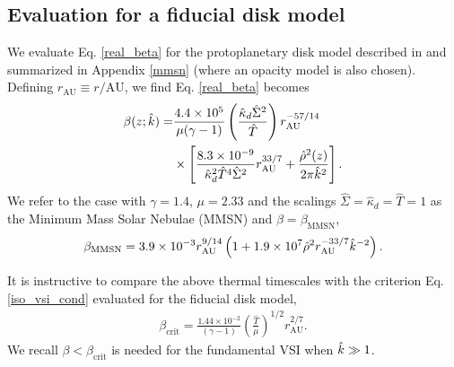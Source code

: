 \subsection{Evaluation for a fiducial disk model}
We evaluate Eq. \ref{real_beta} for the protoplanetary disk model
described in \cite{chiang10} and summarized in Appendix \ref{mmsn}
(where an opacity model is also chosen). Defining $r_\mathrm{AU}\equiv
r/\mathrm{AU}$, we find Eq. \ref{real_beta} becomes
\begin{align}\label{beta_mmsn}
  \beta(z; \hat{k}) =
  &\frac{4.4\times10^5}{\mu(\gamma-1)}\left(\frac{\hat{\kappa}_d\hat{\Sigma}^2}{\hat{T}}\right)r_\mathrm{AU}^{-57/14}\notag\\
&\times\left[\frac{8.3\times10^{-9}}{\hat{\kappa}_d^2\hat{T}^4\hat{\Sigma}^2}r_\mathrm{AU}^{33/7}+\frac{\hat{\rho}^2(z)}{2\pi\hat{k}^2}\right].        
\end{align} 
We refer to the case with $\gamma=1.4$, $\mu=2.33$ and the scalings
$\hat{\Sigma}=\hat{\kappa}_d=\hat{T}=1$ as the Minimum Mass Solar
Nebulae (MMSN) and $\beta=\beta_\mathrm{MMSN}$, 
\begin{align}\label{beta_mmsn_simp}
  \beta_\mathrm{MMSN} = 3.9\times10^{-3} r_\mathrm{AU}^{9/14}\left( 1 +
    1.9\times10^7\hat{\rho}^2r_\mathrm{AU}^{-33/7}\hat{k}^{-2}\right). 
\end{align}

It is instructive to compare the above thermal timescales
with the criterion Eq. \ref{iso_vsi_cond} evaluated for the fiducial disk model,    
\begin{align}\label{bcrit_mmsn}
  \beta_\mathrm{crit} = \frac{1.44\times10^{-2}}{(\gamma
    -1)}\left(\frac{\hat{T}}{\mu}\right)^{1/2}r_\mathrm{AU}^{2/7}. 
\end{align}
We recall $\beta < \beta_\mathrm{crit}$ is needed for the
fundamental VSI when $\hat{k}\gg 1$. %

